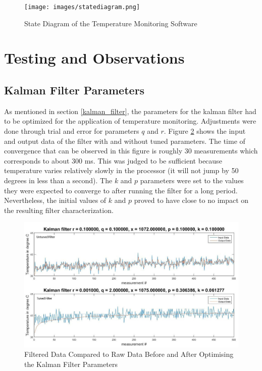 \documentclass[12pt]{article}
\begin{document}
\begin{figure}[!htb]
\centering
\texttt{[image: images/statediagram.png]}
\caption{State Diagram of the Temperature Monitoring Software}
\label{fig:statediagram}
\end{figure}


\section{Testing and Observations}

\subsection{Kalman Filter Parameters}\label{kalman_filter_params}
As mentioned in section \ref{kalman_filter}, the parameters for the kalman filter had to be optimized for the application of temperature monitoring. Adjustments were done through trial and error for parameters $q$ and $r$. Figure \ref{fig:kalmanfilter} shows the input and output data of the filter with and without tuned parameters. The time of convergence that can be observed in this figure is roughly 30 measurements which corresponds to about 300 ms. This was judged to be sufficient because temperature varies relatively slowly in the processor (it will not jump by 50 degrees in less than a second). The $k$ and $p$ parameters were set to the values they were expected to converge to after running the filter for a long period. Nevertheless, the initial values of $k$ and $p$ proved to have close to no impact on the resulting filter characterization.
\begin{figure}[!htb]
\centering
\includegraphics[scale=0.50]{images/kalmanfilter.jpg}
\caption{Filtered Data Compared to Raw Data Before and After Optimising the Kalman Filter Parameters}
\label{fig:kalmanfilter}
\end{figure}
\end{document}
